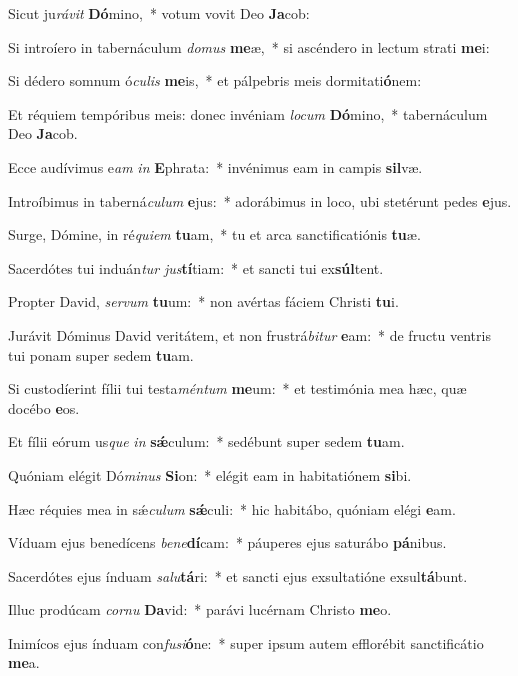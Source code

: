 \item Sicut ju\textit{rá}\textit{vit} \textbf{Dó}mino,~* votum vovit Deo \textbf{Ja}cob:
\item Si introíero in tabernáculum \textit{do}\textit{mus} \textbf{me}æ,~* si ascéndero in lectum strati \textbf{me}i:
\item Si dédero somnum ó\textit{cu}\textit{lis} \textbf{me}is,~* et pálpebris meis dormitati\textbf{ó}nem:
\item Et réquiem tempóribus meis: donec invéniam \textit{lo}\textit{cum} \textbf{Dó}mino,~* tabernáculum Deo \textbf{Ja}cob.
\item Ecce audívimus e\textit{am} \textit{in} \textbf{E}phrata:~* invénimus eam in campis \textbf{sil}væ.
\item Introíbimus in taberná\textit{cu}\textit{lum} \textbf{e}jus:~* adorábimus in loco, ubi stetérunt pedes \textbf{e}jus.
\item Surge, Dómine, in ré\textit{qui}\textit{em} \textbf{tu}am,~* tu et arca sanctificatiónis \textbf{tu}æ.
\item Sacerdótes tui induán\textit{tur} \textit{jus}\textbf{tí}tiam:~* et sancti tui ex\textbf{súl}tent.
\item Propter David, \textit{ser}\textit{vum} \textbf{tu}um:~* non avértas fáciem Christi \textbf{tu}i.
\item Jurávit Dóminus David veritátem, et non frustrá\textit{bi}\textit{tur} \textbf{e}am:~* de fructu ventris tui ponam super sedem \textbf{tu}am.
\item Si custodíerint fílii tui testa\textit{mén}\textit{tum} \textbf{me}um:~* et testimónia mea hæc, quæ docébo \textbf{e}os.
\item Et fílii eórum us\textit{que} \textit{in} \textbf{sǽ}culum:~* sedébunt super sedem \textbf{tu}am.
\item Quóniam elégit Dó\textit{mi}\textit{nus} \textbf{Si}on:~* elégit eam in habitatiónem \textbf{si}bi.
\item Hæc réquies mea in sǽ\textit{cu}\textit{lum} \textbf{sǽ}culi:~* hic habitábo, quóniam elégi \textbf{e}am.
\item Víduam ejus benedícens \textit{be}\textit{ne}\textbf{dí}cam:~* páuperes ejus saturábo \textbf{pá}nibus.
\item Sacerdótes ejus índuam \textit{sa}\textit{lu}\textbf{tá}ri:~* et sancti ejus exsultatióne exsul\textbf{tá}bunt.
\item Illuc prodúcam \textit{cor}\textit{nu} \textbf{Da}vid:~* parávi lucérnam Christo \textbf{me}o.
\item Inimícos ejus índuam con\textit{fu}\textit{si}\textbf{ó}ne:~* super ipsum autem efflorébit sanctificátio \textbf{me}a.
